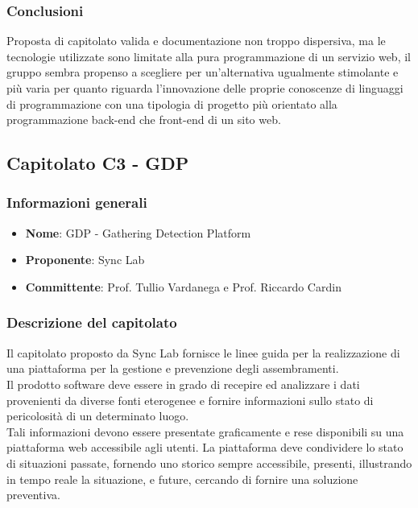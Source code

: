 		\subsubsection{Conclusioni}
			Proposta di capitolato valida e documentazione non troppo dispersiva, ma le tecnologie utilizzate sono limitate alla pura programmazione di un servizio web, il gruppo sembra propenso a scegliere per un’alternativa ugualmente stimolante e più varia per quanto riguarda l’innovazione delle proprie conoscenze di linguaggi di programmazione con una tipologia di progetto più orientato alla programmazione back-end che front-end di un sito web.
\newpage
				
	\subsection{Capitolato C3 - GDP}
		\subsubsection{Informazioni generali}
			\begin{itemize}
				\item\textbf{Nome}: GDP - Gathering Detection Platform
				\item\textbf{Proponente}: Sync Lab
				\item\textbf{Committente}: Prof. Tullio Vardanega e Prof. Riccardo Cardin
			\end{itemize}
			
		\subsubsection{Descrizione del capitolato}
			Il capitolato proposto da Sync Lab fornisce le linee guida per la realizzazione di una piattaforma per la gestione e prevenzione degli assembramenti. \\
			Il prodotto software deve essere in grado di recepire ed analizzare i dati provenienti da diverse fonti eterogenee e fornire informazioni sullo stato di pericolosità di un determinato luogo.\\
			Tali informazioni devono essere presentate graficamente e rese disponibili su una piattaforma web accessibile agli utenti. La piattaforma deve condividere lo stato di situazioni passate, fornendo uno storico sempre accessibile, presenti, illustrando in tempo reale la situazione, e future, cercando di fornire una soluzione preventiva.\\
